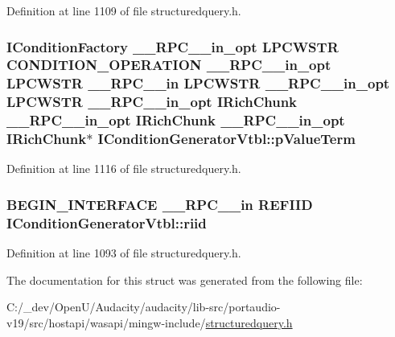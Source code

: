 Definition at line 1109 of file structuredquery.\+h.

\subsubsection[{\texorpdfstring{p\+Value\+Term}{pValueTerm}}]{ {\bf I\+Condition\+Factory} {\bf \+\_\+\+\_\+\+R\+P\+C\+\_\+\+\_\+in\+\_\+opt} {\bf L\+P\+C\+W\+S\+TR} {\bf C\+O\+N\+D\+I\+T\+I\+O\+N\+\_\+\+O\+P\+E\+R\+A\+T\+I\+ON} {\bf \+\_\+\+\_\+\+R\+P\+C\+\_\+\+\_\+in\+\_\+opt} {\bf L\+P\+C\+W\+S\+TR} {\bf \+\_\+\+\_\+\+R\+P\+C\+\_\+\+\_\+in} {\bf L\+P\+C\+W\+S\+TR} {\bf \+\_\+\+\_\+\+R\+P\+C\+\_\+\+\_\+in\+\_\+opt} {\bf L\+P\+C\+W\+S\+TR} {\bf \+\_\+\+\_\+\+R\+P\+C\+\_\+\+\_\+in\+\_\+opt} {\bf I\+Rich\+Chunk} {\bf \+\_\+\+\_\+\+R\+P\+C\+\_\+\+\_\+in\+\_\+opt} {\bf I\+Rich\+Chunk} {\bf \+\_\+\+\_\+\+R\+P\+C\+\_\+\+\_\+in\+\_\+opt} {\bf I\+Rich\+Chunk}$\ast$ I\+Condition\+Generator\+Vtbl\+::p\+Value\+Term}\hypertarget{struct_i_condition_generator_vtbl_ad33414fd7397d7176aa7d05d324b0958}{}\label{struct_i_condition_generator_vtbl_ad33414fd7397d7176aa7d05d324b0958}


Definition at line 1116 of file structuredquery.\+h.

\subsubsection[{\texorpdfstring{riid}{riid}}]{\setlength{\rightskip}{0pt plus 5cm}B\+E\+G\+I\+N\+\_\+\+I\+N\+T\+E\+R\+F\+A\+CE {\bf \+\_\+\+\_\+\+R\+P\+C\+\_\+\+\_\+in} {\bf R\+E\+F\+I\+ID} I\+Condition\+Generator\+Vtbl\+::riid}\hypertarget{struct_i_condition_generator_vtbl_a375f47e2b87cc7a1c052c9f495f33fb0}{}\label{struct_i_condition_generator_vtbl_a375f47e2b87cc7a1c052c9f495f33fb0}


Definition at line 1093 of file structuredquery.\+h.



The documentation for this struct was generated from the following file\+:\begin{DoxyCompactItemize}
\item 
C\+:/\+\_\+dev/\+Open\+U/\+Audacity/audacity/lib-\/src/portaudio-\/v19/src/hostapi/wasapi/mingw-\/include/\hyperlink{structuredquery_8h}{structuredquery.\+h}\end{DoxyCompactItemize}
